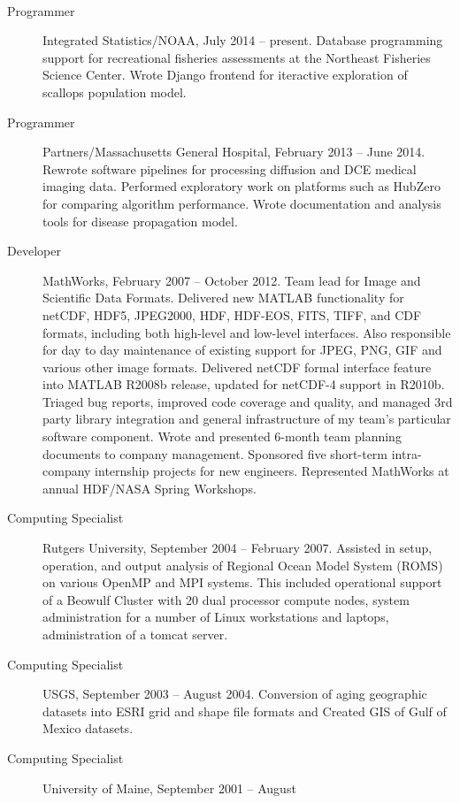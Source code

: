 \documentclass[11pt]{article}  %
\begin{document}
\bigskip 
{}\\ 
\begin{description}
  \item[Programmer] Integrated Statistics/NOAA, July 2014 -- present.
    Database programming support for recreational fisheries assessments
    at the Northeast Fisheries Science Center. Wrote Django frontend
    for iteractive exploration of scallops population model.
  \item[Programmer] Partners/Massachusetts General Hospital, February 2013 --
    June 2014.  Rewrote software pipelines for processing diffusion and
    DCE medical imaging data.  Performed exploratory work on platforms
    such as HubZero  for comparing algorithm performance. Wrote
    documentation and analysis tools for disease propagation model.
  \item[Developer] MathWorks, February 2007 -- October 2012.  Team lead for
    Image and Scientific Data Formats.  Delivered new MATLAB functionality
    for netCDF, HDF5, JPEG2000, HDF, HDF-EOS, FITS, TIFF, and CDF formats,
    including both high-level and low-level interfaces.  Also responsible
    for day to day maintenance of existing support for JPEG, PNG, GIF
    and various other image formats.  Delivered netCDF formal interface
    feature into MATLAB R2008b release, updated for netCDF-4 support
    in R2010b. Triaged bug reports, improved code coverage and quality,
    and managed 3rd party library integration and general infrastructure
    of my team's particular software component.  Wrote and presented
    6-month team planning documents to company management.  Sponsored
    five short-term intra-company internship projects for new engineers.
    Represented MathWorks at annual HDF/NASA Spring Workshops.
  \item[Computing Specialist] Rutgers University, September 2004 --
    February 2007. Assisted in setup,  operation, and output analysis  of
    Regional Ocean Model System (ROMS) on various OpenMP and MPI systems.
    This included operational support of a Beowulf Cluster with 20 dual
    processor compute nodes, system administration for a number of Linux
    workstations and laptops, administration of a tomcat server.
  \item[Computing Specialist] USGS, September 2003 -- August 2004.  
    Conversion of aging geographic datasets into ESRI grid and shape
    file formats and Created GIS of Gulf of Mexico datasets.
  \item[Computing Specialist] University of Maine, September 2001 -- August

\end{description}
\end{document}

